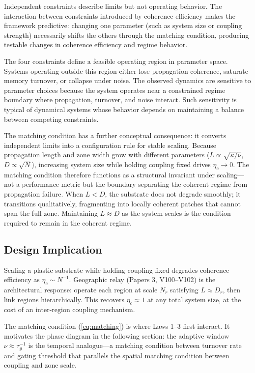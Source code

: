 \documentclass[11pt]{article}
\begin{document}
Independent constraints describe limits but not operating behavior. The interaction between constraints introduced by coherence efficiency makes the framework predictive: changing one parameter (such as system size or coupling strength) necessarily shifts the others through the matching condition, producing testable changes in coherence efficiency and regime behavior.

The four constraints define a feasible operating region in parameter space. Systems operating outside this region either lose propagation coherence, saturate memory turnover, or collapse under noise. The observed dynamics are sensitive to parameter choices because the system operates near a constrained regime boundary where propagation, turnover, and noise interact. Such sensitivity is typical of dynamical systems whose behavior depends on maintaining a balance between competing constraints.

The matching condition has a further conceptual consequence: it converts independent limits into a configuration rule for stable scaling. Because propagation length and zone width grow with different parameters ($L \propto \sqrt{\kappa/\nu}$, $D \propto \sqrt{N}$), increasing system size while holding coupling fixed drives $\eta_c \to 0$. The matching condition therefore functions as a structural invariant under scaling---not a performance metric but the boundary separating the coherent regime from propagation failure. When $L < D$, the substrate does not degrade smoothly; it transitions qualitatively, fragmenting into locally coherent patches that cannot span the full zone. Maintaining $L \approx D$ as the system scales is the condition required to remain in the coherent regime.

\subsection{Design Implication}

Scaling a plastic substrate while holding coupling fixed degrades coherence efficiency as $\eta_c \sim N^{-1}$. Geographic relay (Papers 3, V100--V102) is the architectural response: operate each region at scale $N_r$ satisfying $L \approx D_r$, then link regions hierarchically. This recovers $\eta_c \approx 1$ at any total system size, at the cost of an inter-region coupling mechanism.

The matching condition (\ref{eq:matching}) is where Laws 1--3 first interact. It motivates the phase diagram in the following section: the adaptive window $\nu \approx \tau_g^{-1}$ is the temporal analogue---a matching condition between turnover rate and gating threshold that parallels the spatial matching condition between coupling and zone scale.
\end{document}
